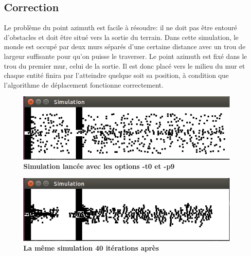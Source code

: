 \documentclass[11pt]{article} %
\begin{document}
\subsection{Correction}

Le problème du point azimuth est facile à résoudre: il ne doit pas être entouré d'obstacles et doit être situé vers la sortie du terrain. Dans cette simulation, le monde est occupé par deux murs séparés d'une certaine distance avec un trou de largeur suffisante pour qu'on puisse le traverser. Le point azimuth est fixé dans le trou du premier mur, celui de la sortie. Il est donc placé vers le milieu du mur et chaque entité finira par l'atteindre quelque soit sa position, à condition que l'algorithme de déplacement fonctionne correctement.


\begin{figure}[h]
\caption{\label{f1} \textbf{Simulation lancée avec les options -t0 et -p9}}
  \centering
\includegraphics[width=12cm]{graph}
\end{figure}

\begin{figure}[h]
\caption{\label{f2} \textbf{La même simulation 40 itérations après}}
  \centering
\includegraphics[width=12cm]{graph2}
\end{figure}
\end{document}
